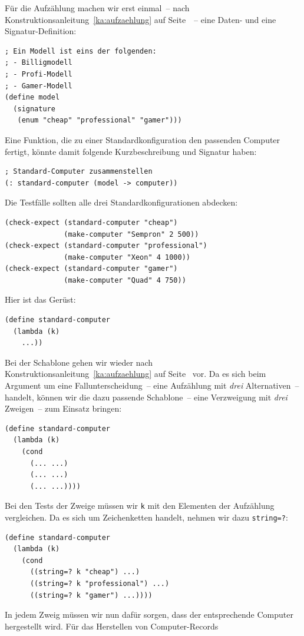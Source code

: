 Für die Aufzählung machen wir erst einmal~-- nach
Konstruktionsanleitung~\ref{ka:aufzaehlung} auf
Seite~\pageref{ka:aufzaehlung}~-- eine Daten- und eine
Signatur-Definition:
%
\begin{lstlisting}
; Ein Modell ist eins der folgenden:
; - Billigmodell
; - Profi-Modell
; - Gamer-Modell
(define model
  (signature
   (enum "cheap" "professional" "gamer")))
\end{lstlisting}
%
Eine Funktion, die zu einer Standardkonfiguration den passenden
Computer fertigt, könnte damit folgende Kurzbeschreibung und Signatur haben:
%
\begin{lstlisting}
; Standard-Computer zusammenstellen
(: standard-computer (model -> computer))
\end{lstlisting}
%
Die Testfälle sollten alle drei Standardkonfigurationen abdecken:
%
\begin{lstlisting}
(check-expect (standard-computer "cheap")
              (make-computer "Sempron" 2 500))
(check-expect (standard-computer "professional")
              (make-computer "Xeon" 4 1000))
(check-expect (standard-computer "gamer")
              (make-computer "Quad" 4 750))
\end{lstlisting}
%
Hier ist das Gerüst:
%
\begin{lstlisting}
(define standard-computer
  (lambda (k)
    ...))
\end{lstlisting}
%
Bei der Schablone gehen wir wieder nach Konstruktionsanleitung~\ref{ka:aufzaehlung} auf
Seite~\pageref{ka:aufzaehlung} vor.
Da es sich beim Argument um eine Fallunterscheidung~-- eine Aufzählung
mit \emph{drei} Alternativen~-- handelt, können wir die
dazu passende Schablone~-- eine Verzweigung mit \emph{drei} Zweigen~--
zum Einsatz bringen:
%
\begin{lstlisting}
(define standard-computer
  (lambda (k)
    (cond
      (... ...)
      (... ...)
      (... ...))))
\end{lstlisting}
%
Bei den Tests der Zweige müssen wir \lstinline{k} mit den Elementen der
Aufzählung vergleichen.  Da es sich um Zeichenketten handelt, nehmen
wir dazu \lstinline{string=?}:
%
\begin{lstlisting}
(define standard-computer
  (lambda (k)
    (cond
      ((string=? k "cheap") ...)
      ((string=? k "professional") ...)
      ((string=? k "gamer") ...))))
\end{lstlisting}
%
In jedem Zweig müssen wir nun dafür sorgen, dass der entsprechende
Computer hergestellt wird.  Für das Herstellen von Computer-Records
